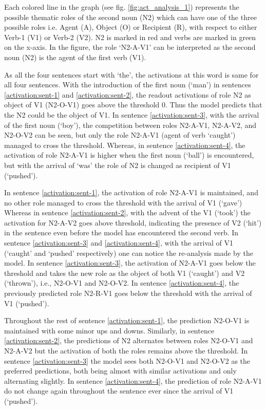 Each colored line in the graph (see fig. \ref{fig:act_analysis_1}) represents the possible thematic roles of the second noun (N2) which can have one of the three possible roles i.e. Agent (A), Object (O) or Recipient (R), with respect to either Verb-1 (V1) or Verb-2 (V2). N2 is marked in red and verbs are marked in green on the x-axis. In the figure, the role `N2-A-V1' can be interpreted as the second noun (N2) is the agent of the first verb (V1). 

As all the four sentences start with `the', the activations at this word is same for all four sentences. With the introduction of the first noun (`man') in sentences \ref{activation:sent-1} and \ref{activation:sent-2}, the readout activations of role N2 as object of V1 (N2-O-V1) goes above the threshold 0. Thus the model predicts that the N2 could be the object of V1. In sentence \ref{activation:sent-3}, with the arrival of the first noun (`boy'), the competition between roles N2-A-V1, N2-A-V2, and N2-O-V2 can be seen, but only the role N2-A-V1 (agent of verb `caught') managed to cross the threshold. Whereas, in sentence \ref{activation:sent-4}, the activation of role N2-A-V1 is higher when the first noun (`ball') is encountered, but with the arrival of `was' the role of N2 is changed as recipient of V1 (`pushed').

In sentence \ref{activation:sent-1}, the activation of role N2-A-V1 is maintained, and no other role managed to cross the threshold with the arrival of V1 (`gave')
Whereas in sentence \ref{activation:sent-2}, with the advent of the V1 (`took') the activation for N2-A-V2 goes above threshold, indicating the presence of V2 (`hit') in the sentence even before the model has encountered the second verb. In sentence \ref{activation:sent-3} and \ref{activation:sent-4}, with the arrival of V1 (`caught' and `pushed' respectively) one can notice the re-analysis made by the model. In sentence \ref{activation:sent-3}, the activation of N2-A-V1 goes below the threshold and takes the new role as the object of both V1 (`caught') and V2 (`thrown'), i.e., N2-O-V1 and N2-O-V2. In sentence \ref{activation:sent-4}, the previously predicted role N2-R-V1 goes below the threshold with the arrival of V1 (`pushed').

Throughout the rest of sentence \ref{activation:sent-1}, the prediction N2-O-V1 is maintained with some minor ups and downs. Similarly, in sentence \ref{activation:sent-2}, the predictions of N2 alternates between roles N2-O-V1 and N2-A-V2 but the activation of both the roles remains above the threshold. In sentence \ref{activation:sent-3} the model sees both N2-O-V1 and N2-O-V2 as the preferred predictions, both being almost with similar activations and only alternating slightly. In sentence \ref{activation:sent-4}, the prediction of role N2-A-V1 do not change again throughout the sentence ever since the arrival of V1 (`pushed').

